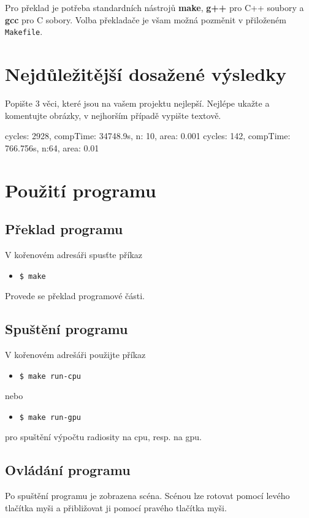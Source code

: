 \documentclass[11pt,a4paper]{article}
\begin{document}
Pro překlad je potřeba standardních nástrojů \textbf{make}, \textbf{g++} pro C++ soubory a \textbf{gcc} pro C sobory. Volba překladače je všam možná pozměnit v přiloženém \texttt{Makefile}.


\section{Nejdůležitější dosažené výsledky}

Popište 3 věci, které jsou na vašem projektu nejlepší. Nejlépe ukažte a
komentujte obrázky, v nejhorším případě vypište textově.


cycles: 2928, compTime: 34748.9s, n: 10, area: 0.001
cycles: 142, compTime: 766.756s, n:64, area: 0.01
\section{Použití programu}

\subsection{Překlad programu}
V kořenovém adresáři spusťte příkaz
\begin{itemize}
  \item[] \texttt{\$ make}
\end{itemize}
Provede se překlad programové části.


\subsection{Spuštění programu}
V kořenovém adrešáři použijte příkaz
\begin{itemize}
  \item[] \texttt{\$ make run-cpu}
\end{itemize}
nebo
\begin{itemize}
  \item[] \texttt{\$ make run-gpu}
\end{itemize}
pro spuštění výpočtu radiosity na cpu, resp. na gpu.


\subsection{Ovládání programu}
Po spuštění programu je zobrazena scéna. Scénou lze rotovat pomocí levého tlačítka myši a přibližovat ji pomocí pravého tlačítka myši.
\end{document}
